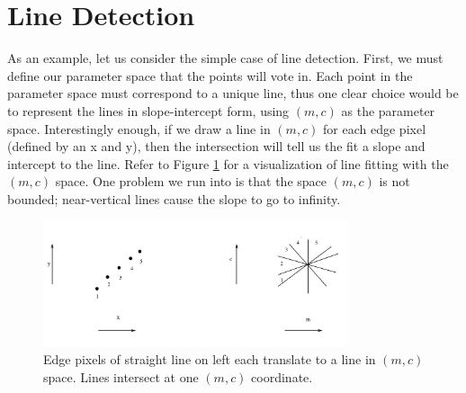 \documentclass{article}
\begin{document}
\section{Line Detection}

As an example, let us consider the simple case of line detection. First, we must define our parameter space that the points will vote in. Each point in the parameter space must correspond to a unique line, thus one clear choice would be to represent the lines in slope-intercept form, using \begin{math}(m,c)\end{math} as the parameter space. Interestingly enough, if we draw a line in \begin{math}(m,c)\end{math} for each edge pixel (defined by an x and y), then the intersection will tell us the fit a slope and intercept to the line. Refer to Figure \ref{fig:spaces} for a visualization of line fitting with the $(m,c)$ space. One problem we run into is that the space \begin{math}(m,c)\end{math} is not bounded; near-vertical lines cause the slope to go to infinity. 

\begin{figure}[!h]
    \centering
    \includegraphics[width=0.8\textwidth]{spaces}
    \caption{Edge pixels of straight line on left each translate to a line in $(m,c)$ space. Lines intersect at one $(m,c)$ coordinate.}
    \label{fig:spaces}
\end{figure}
\end{document}
